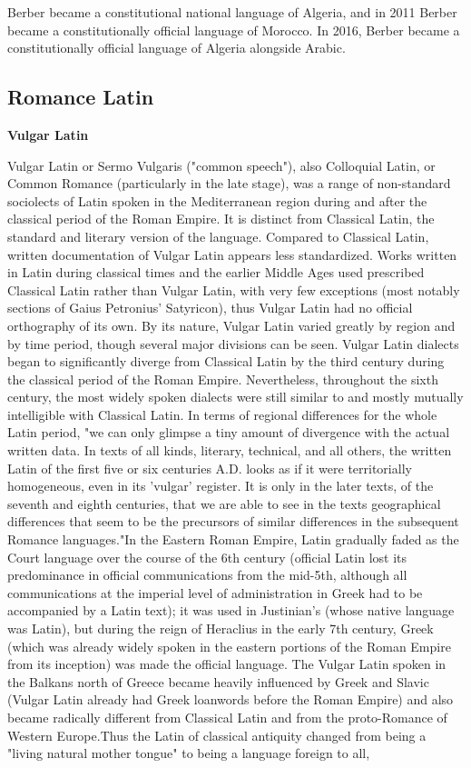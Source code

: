 \documentclass[11pt]{scrartcl} %
\begin{document}
Berber became a constitutional national language of Algeria, and in 2011 Berber became a constitutionally official language of Morocco. In 2016, Berber became a constitutionally official language of Algeria alongside Arabic.\par

\subsection{Romance Latin}

\textbf{Vulgar Latin} \par

Vulgar Latin or Sermo Vulgaris ("common speech"), also Colloquial Latin, or Common Romance (particularly in the late stage), was a range of non-standard sociolects of Latin spoken in the Mediterranean region during and after the classical period of the Roman Empire. It is distinct from Classical Latin, the standard and literary version of the language. Compared to Classical Latin, written documentation of Vulgar Latin appears less standardized. Works written in Latin during classical times and the earlier Middle Ages used prescribed Classical Latin rather than Vulgar Latin, with very few exceptions (most notably sections of Gaius Petronius' Satyricon), thus Vulgar Latin had no official orthography of its own. By its nature, Vulgar Latin varied greatly by region and by time period, though several major divisions can be seen. Vulgar Latin dialects began to significantly diverge from Classical Latin by the third century during the classical period of the Roman Empire. Nevertheless, throughout the sixth century, the most widely spoken dialects were still similar to and mostly mutually intelligible with Classical Latin. In terms of regional differences for the whole Latin period, "we can only glimpse a tiny amount of divergence with the actual written data. In texts of all kinds, literary, technical, and all others, the written Latin of the first five or six centuries A.D. looks as if it were territorially homogeneous, even in its 'vulgar' register. It is only in the later texts, of the seventh and eighth centuries, that we are able to see in the texts geographical differences that seem to be the precursors of similar differences in the subsequent Romance languages."In the Eastern Roman Empire, Latin gradually faded as the Court language over the course of the 6th century (official Latin lost its predominance in official communications from the mid-5th, although all communications at the imperial level of administration in Greek had to be accompanied by a Latin text); it was used in Justinian's (whose native language was Latin), but during the reign of Heraclius in the early 7th century, Greek (which was already widely spoken in the eastern portions of the Roman Empire from its inception) was made the official language. The Vulgar Latin spoken in the Balkans north of Greece became heavily influenced by Greek and Slavic (Vulgar Latin already had Greek loanwords before the Roman Empire) and also became radically different from Classical Latin and from the proto-Romance of Western Europe.Thus the Latin of classical antiquity changed from being a "living natural mother tongue" to being a language foreign to all, 
\end{document}
